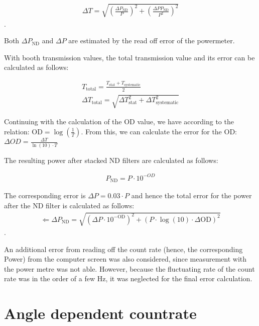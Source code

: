 \begin{align}
    \Delta T= \sqrt{\left(\frac{\Delta P_{\text{ND}}}{P}\right)^2 + \left(\frac{\Delta P P_{\text{ND}}}{ P^2}\right)^2}
\end{align}.

Both $\Delta P_{\text{ND}}$ and $\Delta P$ are estimated by the read off error of the powermeter.


With booth transmission values, the total transmission value and its error can be calculated as follows:

\begin{align}
    T_{\text{total}} = \frac{T_{\text{stat}} + T_{\text{systematic}}}{2}\\
    \Delta T_{\text{total}} = \sqrt{\Delta T_{\text{stat}}^2 + \Delta T_{\text{systematic}}^2}
\end{align}


Continuing with the calculation of the OD value, we have according to \cite{Thorlabs-OD} the relation:
 $\text{OD}= \log(\frac{1}{T})$.
From this, we can calculate the error for the OD: $\Delta OD = \frac{\Delta T}{\ln(10) \cdot T}$


The resulting power after stacked ND filters are calculated as follows:

\begin{align}
    P_{\text{ND}} = P \cdot 10^{-OD}
\end{align}

The corresponding error is  $\Delta P = 0.03 \cdot P $ and hence the total error for the power after the ND filter is calculated as follows:
\begin{align}
    \Leftarrow \Delta P_{\text{ND}} = \sqrt{(\Delta P \cdot 10^{-\text{OD}})^2 + (P \cdot \log(10) \cdot \Delta \text{OD})^2}
\end{align}.

An additional error from reading off the count rate (hence, the corresponding Power) from the computer screen was also considered,
since measurement with the power metre was not able.
However, because the fluctuating rate of the count rate was in the order of a few Hz, it was neglected for the final error calculation.


\section{Angle dependent countrate}\label{sec:angle_dependent_countrate_results_appendix}

